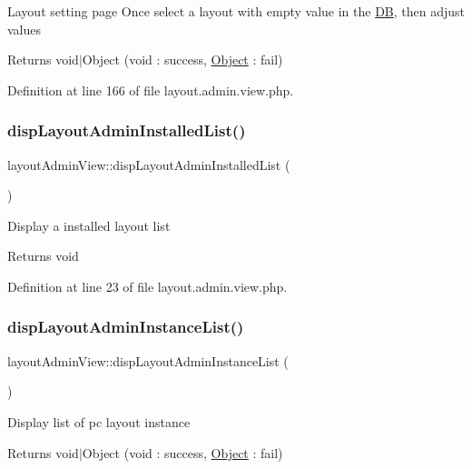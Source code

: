 Layout setting page Once select a layout with empty value in the \hyperlink{classDB}{DB}, then adjust values \begin{DoxyReturn}{Returns}
void$\vert$\+Object (void \+: success, \hyperlink{classObject}{Object} \+: fail) 
\end{DoxyReturn}


Definition at line 166 of file layout.\+admin.\+view.\+php.

\mbox{\label{classlayoutAdminView_acad8194900695a9aa48ff6dca1435dd3}} 
\subsubsection{\texorpdfstring{disp\+Layout\+Admin\+Installed\+List()}{dispLayoutAdminInstalledList()}}
{\footnotesize\ttfamily layout\+Admin\+View\+::disp\+Layout\+Admin\+Installed\+List (\begin{DoxyParamCaption}{ }\end{DoxyParamCaption})}

Display a installed layout list \begin{DoxyReturn}{Returns}
void 
\end{DoxyReturn}


Definition at line 23 of file layout.\+admin.\+view.\+php.

\mbox{\label{classlayoutAdminView_ab392ea5f53d762ac9da15fe6d40c1e6b}} 
\subsubsection{\texorpdfstring{disp\+Layout\+Admin\+Instance\+List()}{dispLayoutAdminInstanceList()}}
{\footnotesize\ttfamily layout\+Admin\+View\+::disp\+Layout\+Admin\+Instance\+List (\begin{DoxyParamCaption}{ }\end{DoxyParamCaption})}

Display list of pc layout instance \begin{DoxyReturn}{Returns}
void$\vert$\+Object (void \+: success, \hyperlink{classObject}{Object} \+: fail) 
\end{DoxyReturn}


